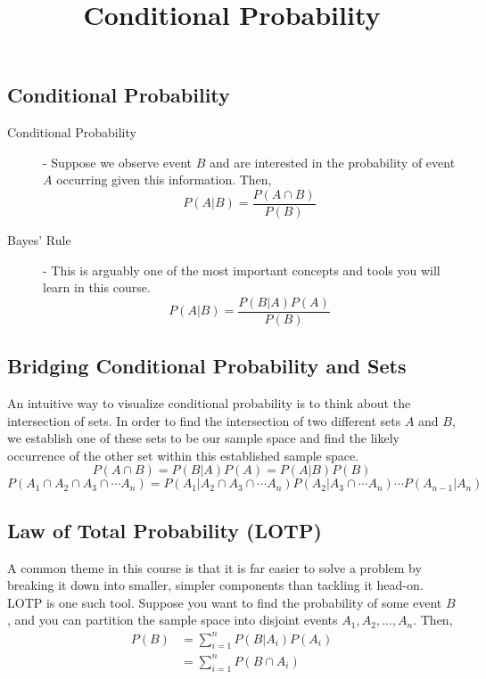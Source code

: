 \documentclass[11pt]{article}
\title{Conditional Probability}
\author{\justin}
\begin{document}
\maketitle

\begin{notes}

\section*{Conditional Probability}
\begin{description}
    \item[Conditional Probability] - Suppose we observe event $B$ and are interested in the probability of event $A$ occurring given this information. Then,
        \[P(A|B) = \frac{P(A \cap B)}{P(B)}\]
    \item[Bayes' Rule] - This is arguably one of the most important concepts and tools you will
    learn in this course. 
        \[P(A|B) = \frac{P(B|A)P(A)}{P(B)}\]
\end{description}

\subsection*{Bridging Conditional Probability and Sets}

An intuitive way to visualize conditional probability is to think about the intersection of sets.  In order to find the intersection of two different sets ${A}$ and ${B}$, we establish one of these sets to be our sample space and find the likely occurrence of the other set within this established sample space.
       $$P(A\cap B) = P(B|A)P(A) = P(A|B)P(B)$$
$$P(A_1\cap A_2\cap A_3\cap\cdots A_n) = P(A_1|A_2\cap A_3\cap\cdots A_n)P(A_2| A_3\cap\cdots A_n)\cdots P(A_{n-1}|A_n)$$

\subsection*{Law of Total Probability (LOTP)}
A common theme in this course is that it is far easier to solve a problem by breaking it down into smaller, simpler components than tackling it head-on. LOTP is one such tool. Suppose you want to find the probability of some event $B$, and you can partition the sample space into disjoint events $A_1, A_2, \dots, A_n$. Then, 
\begin{align}
    P(B) &= \sum_{i=1}^n P(B | A_i) P(A_i)\\
    &= \sum_{i=1}^n P(B \cap A_i)
\end{align}


\end{notes}
\end{document}
